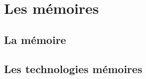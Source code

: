 \section{Les mémoires}



\subsection{La mémoire}









\subsection{Les technologies mémoires}




